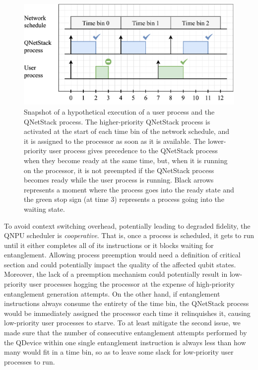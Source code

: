 \begin{figure}
\begin{center}
\includegraphics[width=\linewidth]{figures/qnodeos/supplementary/scheduling-impl.pdf}
\end{center}
\caption[]{Snapshot of a hypothetical execution of a user process and the \ac{QNetStack} process. The higher-priority \ac{QNetStack} process is activated at the start of each time bin of the network schedule, and it is assigned to the processor as soon as it is available. The lower-priority user process gives precedence to the \ac{QNetStack} process when they become ready at the same time, but, when it is running on the processor, it is not preempted if the \ac{QNetStack} process becomes ready while the user process is running. Black arrows represents a moment where the process goes into the ready state and the green stop sign (at time $3$) represents a process going into the waiting state.}
\label{fig:scheduling-impl}
\end{figure}

To avoid context switching overhead, potentially leading to degraded fidelity, the \ac{QNPU} scheduler is \emph{cooperative}. That is, once a process is scheduled, it gets to run until it either completes all of its instructions or it blocks waiting for entanglement. Allowing process preemption would need a definition of critical section and could potentially impact the quality of the affected qubit states. Moreover, the lack of a preemption mechanism could potentially result in low-priority user processes hogging the processor at the expense of high-priority entanglement generation attempts. On the other hand, if entanglement instructions always consume the entirety of the time bin, the \ac{QNetStack} process would be immediately assigned the processor each time it relinquishes it, causing low-priority user processes to starve. To at least mitigate the second issue, we made sure that the number of consecutive entanglement attempts performed by the \ac{QDevice} within one single entanglement instruction is always less than how many would fit in a time bin, so as to leave some slack for low-priority user processes to run.

